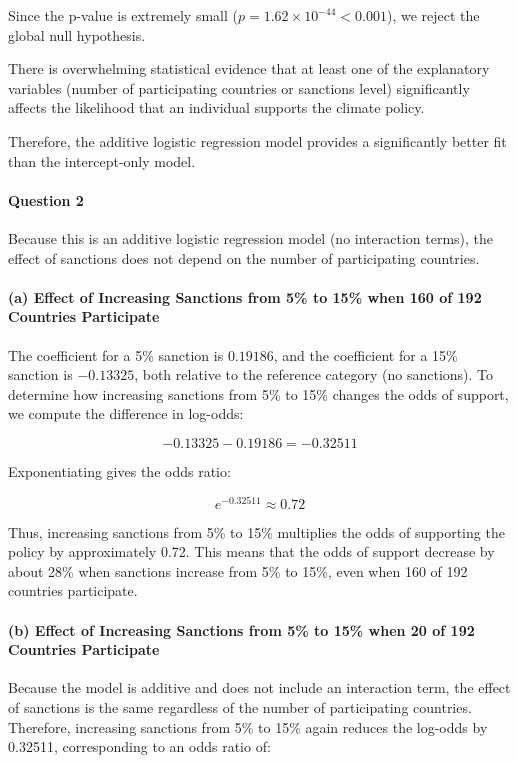 \documentclass[12pt,letterpaper]{article}
\begin{document}
Since the p-value is extremely small ($p = 1.62 \times 10^{-44} < 0.001$), we reject the global null hypothesis.

There is overwhelming statistical evidence that at least one of the explanatory variables (number of participating countries or sanctions level) significantly affects the likelihood that an individual supports the climate policy.

Therefore, the additive logistic regression model provides a significantly better fit than the intercept-only model.

\vspace{1cm}


\paragraph{Question 2} Because this is an additive logistic regression model (no interaction terms), 
the effect of sanctions does not depend on the number of participating countries.


\paragraph{(a) Effect of Increasing Sanctions from 5\% to 15\% 
	when 160 of 192 Countries Participate}

The coefficient for a 5\% sanction is $0.19186$, and the coefficient for a 15\% sanction is $-0.13325$, both relative to the reference category (no sanctions). To determine how increasing sanctions from 5\% to 15\% changes the odds of support, we compute the difference in log-odds:

\[
-0.13325 - 0.19186 = -0.32511
\]

Exponentiating gives the odds ratio:

\[
e^{-0.32511} \approx 0.72
\]

Thus, increasing sanctions from 5\% to 15\% multiplies the odds of supporting the policy by approximately 0.72. This means that the odds of support decrease by about 28\% when sanctions increase from 5\% to 15\%, even when 160 of 192 countries participate.

\paragraph*{(b) Effect of Increasing Sanctions from 5\% to 15\% 
	when 20 of 192 Countries Participate}

Because the model is additive and does not include an interaction term, the effect of sanctions is the same regardless of the number of participating countries. Therefore, increasing sanctions from 5\% to 15\% again reduces the log-odds by 0.32511, corresponding to an odds ratio of:
\end{document}

